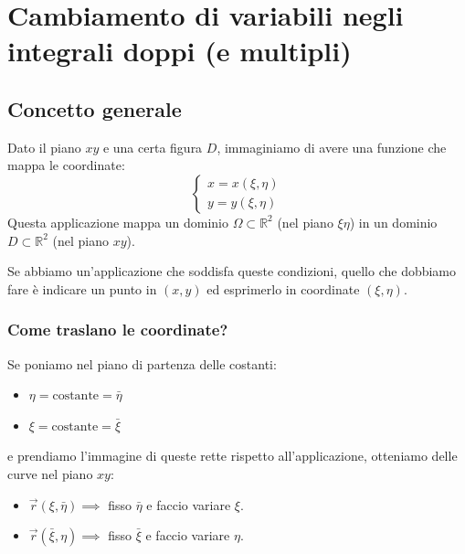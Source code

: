 \chapter{Cambiamento di variabili negli integrali doppi (e multipli)}

\section{Concetto generale}
Dato il piano $xy$ e una certa figura $D$, immaginiamo di avere una funzione che mappa le coordinate:
\[
\begin{cases}
x = x(\xi, \eta) \\
y = y(\xi, \eta)
\end{cases}
\]
Questa applicazione mappa un dominio $\Omega \subset \mathbb{R}^2$ (nel piano $\xi\eta$) in un dominio $D \subset \mathbb{R}^2$ (nel piano $xy$).

Se abbiamo un'applicazione che soddisfa queste condizioni, quello che dobbiamo fare è indicare un punto in $(x, y)$ ed esprimerlo in coordinate $(\xi, \eta)$.

\subsection{Come traslano le coordinate?}
Se poniamo nel piano di partenza delle costanti:
\begin{itemize}
    \item $\eta = \text{costante} = \bar{\eta}$
    \item $\xi = \text{costante} = \bar{\xi}$
\end{itemize}
e prendiamo l'immagine di queste rette rispetto all'applicazione, otteniamo delle curve nel piano $xy$:
\begin{itemize}
    \item $\vec{r}(\xi, \bar{\eta}) \implies$ fisso $\bar{\eta}$ e faccio variare $\xi$.
    \item $\vec{r}(\bar{\xi}, \eta) \implies$ fisso $\bar{\xi}$ e faccio variare $\eta$.
\end{itemize}

